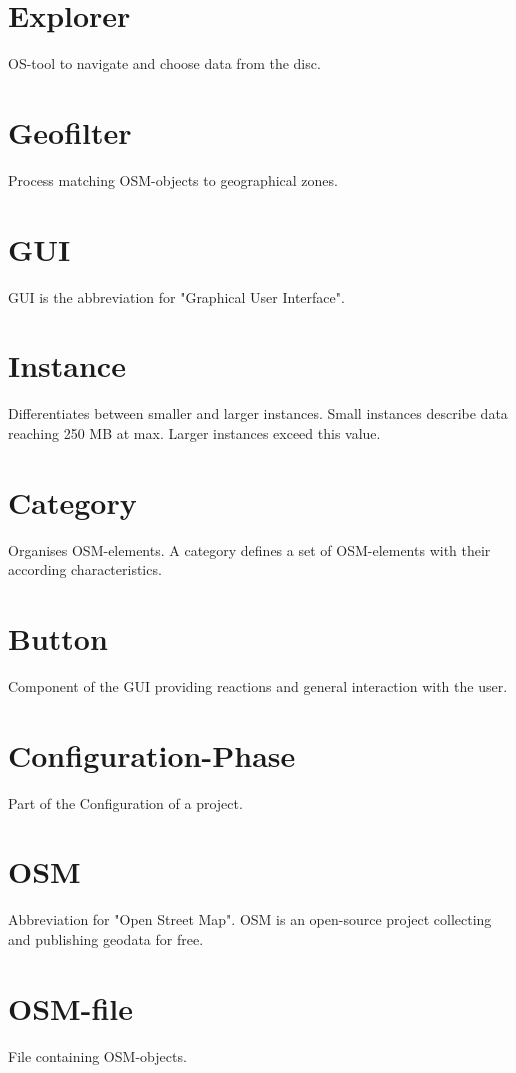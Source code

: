 \documentclass[letterpaper,10pt,english]{sphinxmanual}
\begin{document}
\section*{Explorer}
OS-tool to navigate and choose data from the disc.

\section*{Geofilter}
Process matching OSM-objects to geographical zones.

\section*{GUI}
GUI is the abbreviation for "Graphical User Interface".

\section*{Instance}
Differentiates between smaller and larger instances. Small instances describe data reaching 250 MB at max. Larger instances exceed this value.

\section*{Category}
Organises OSM-elements. A category defines a set of OSM-elements with their according characteristics.

\section*{Button}
Component of the GUI providing reactions and general interaction with the user.

\section*{Configuration-Phase}
Part of the Configuration of a project.

\section*{OSM}
Abbreviation for "Open Street Map". OSM is an open-source project collecting and publishing geodata for free.

\section*{OSM-file}
File containing OSM-objects.
\end{document}
